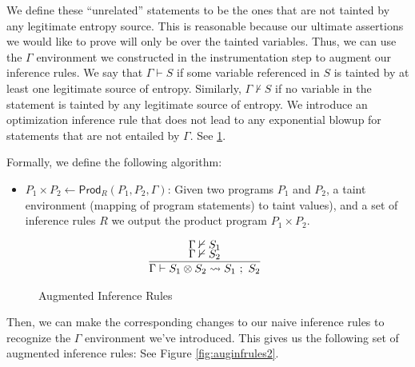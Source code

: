 \documentclass[letterpaper,twocolumn,10pt]{article}
\newcommand{\cross}{\otimes{}}
\begin{document}
We define these ``unrelated'' statements to be the ones that are not tainted by any legitimate entropy source. This is reasonable because our ultimate assertions we would like to prove will only be over the tainted variables. Thus, we can use the $\Gamma$ environment we constructed in the instrumentation step to augment our inference rules. We say that $\Gamma \vdash S$ if some variable referenced in $S$ is tainted by at least one legitimate source of entropy. Similarly, $\Gamma \nvdash S$ if no variable in the statement is tainted by any legitimate source of entropy. We introduce an optimization inference rule that does not lead to any exponential blowup for statements that are not entailed by $\Gamma$. See \ref{fig:auginfrules1}.

Formally, we define the following algorithm:

\begin{itemize}
    \item $P_1 \times P_2 \gets \mathsf{Prod}_R(P_1, P_2, \Gamma)$: Given two programs $P_1$ and $P_2$, a taint environment (mapping of program statements) to 
    taint values), and a set of inference rules $R$ we output the product program $P_1 \times P_2$.
\end{itemize}

\begin{figure}
    \caption{Augmented Inference Rules}
    \label{fig:auginfrules1}
    \[
		\begin{array}{c}
			\infer[]{\Gamma \vdash S_1 \cross S_2 \leadsto S_1\ ;\ S_2}{
				\Gamma \nvdash S_1 \\
				\Gamma \nvdash S_2
			} \\
		\end{array}
    \]
\end{figure}

Then, we can make the corresponding changes to our naive inference rules to recognize the $\Gamma$ environment we've introduced. This gives us the following set of augmented inference rules: See Figure \ref{fig:auginfrules2}.
\end{document}
